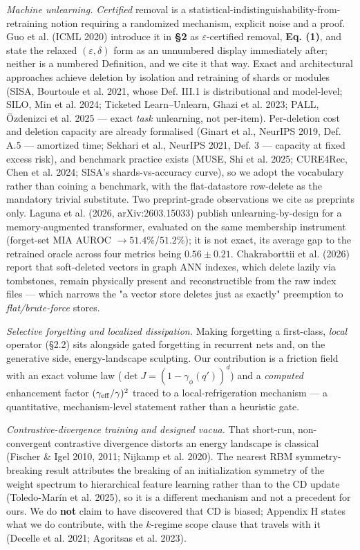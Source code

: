 \documentclass{article}
\begin{document}
\emph{Machine unlearning.} \emph{Certified} removal is a statistical-indistinguishability-from-retraining notion requiring a randomized mechanism, explicit noise and a proof. Guo et al. (ICML 2020) introduce it in \textbf{\S 2} as $\varepsilon$-certified removal, \textbf{Eq. (1)}, and state the relaxed $(\varepsilon,\delta)$ form as an unnumbered display immediately after; neither is a numbered Definition, and we cite it that way. Exact and architectural approaches achieve deletion by isolation and retraining of shards or modules (SISA, Bourtoule et al. 2021, whose Def. III.1 is distributional and model-level; SILO, Min et al. 2024; Ticketed Learn--Unlearn, Ghazi et al. 2023; PALL, \"Ozdenizci et al. 2025 --- exact \emph{task} unlearning, not per-item). Per-deletion cost and deletion capacity are already formalised (Ginart et al., NeurIPS 2019, Def. A.5 --- amortized time; Sekhari et al., NeurIPS 2021, Def. 3 --- capacity at fixed excess risk), and benchmark practice exists (MUSE, Shi et al. 2025; CURE4Rec, Chen et al. 2024; SISA's shards-vs-accuracy curve), so we adopt the vocabulary rather than coining a benchmark, with the flat-datastore row-delete as the mandatory trivial substitute. Two preprint-grade observations we cite as preprints only. Laguna et al. (2026, arXiv:2603.15033) publish unlearning-by-design for a memory-augmented transformer, evaluated on the same membership instrument (forget-set MIA AUROC $\to51.4\%$/$51.2\%$); it is not exact, its average gap to the retrained oracle across four metrics being $0.56\pm0.21$. Chakraborttii et al. (2026) report that soft-deleted vectors in graph ANN indexes, which delete lazily via tombstones, remain physically present and reconstructible from the raw index files --- which narrows the "a vector store deletes just as exactly" preemption to \emph{flat/brute-force} stores.

\emph{Selective forgetting and localized dissipation.} Making forgetting a first-class, \emph{local} operator (\S 2.2) sits alongside gated forgetting in recurrent nets and, on the generative side, energy-landscape sculpting. Our contribution is a friction field with an exact volume law ($\det J=(1-\gamma_\phi(q'))^d$) and a \emph{computed} enhancement factor $(\gamma_{\rm eff}/\gamma)^2$ traced to a local-refrigeration mechanism --- a quantitative, mechanism-level statement rather than a heuristic gate.

\emph{Contrastive-divergence training and designed vacua.} That short-run, non-convergent contrastive divergence distorts an energy landscape is classical (Fischer \& Igel 2010, 2011; Nijkamp et al. 2020). The nearest RBM symmetry-breaking result attributes the breaking of an initialization symmetry of the weight spectrum to hierarchical feature learning rather than to the CD update (Toledo-Mar\'in et al. 2025), so it is a different mechanism and not a precedent for ours. We do \textbf{not} claim to have discovered that CD is biased; Appendix H states what we do contribute, with the $k$-regime scope clause that travels with it (Decelle et al. 2021; Agoritsas et al. 2023).
\end{document}
